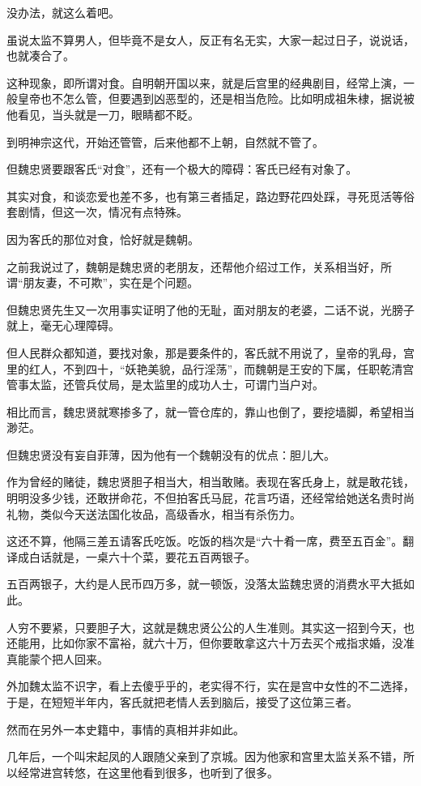\begin{multicols}{\theparacolNo}
		没办法，就这么着吧。

		虽说太监不算男人，但毕竟不是女人，反正有名无实，大家一起过日子，说说话，也就凑合了。

		这种现象，即所谓对食。自明朝开国以来，就是后宫里的经典剧目，经常上演，一般皇帝也不怎么管，但要遇到凶恶型的，还是相当危险。比如明成祖朱棣，据说被他看见，当头就是一刀，眼睛都不眨。

		到明神宗这代，开始还管管，后来他都不上朝，自然就不管了。

		但魏忠贤要跟客氏“对食”，还有一个极大的障碍：客氏已经有对象了。

		其实对食，和谈恋爱也差不多，也有第三者插足，路边野花四处踩，寻死觅活等俗套剧情，但这一次，情况有点特殊。

		因为客氏的那位对食，恰好就是魏朝。

		之前我说过了，魏朝是魏忠贤的老朋友，还帮他介绍过工作，关系相当好，所谓“朋友妻，不可欺”，实在是个问题。

		但魏忠贤先生又一次用事实证明了他的无耻，面对朋友的老婆，二话不说，光膀子就上，毫无心理障碍。

		但人民群众都知道，要找对象，那是要条件的，客氏就不用说了，皇帝的乳母，宫里的红人，不到四十，“妖艳美貌，品行淫荡”，而魏朝是王安的下属，任职乾清宫管事太监，还管兵仗局，是太监里的成功人士，可谓门当户对。

		相比而言，魏忠贤就寒掺多了，就一管仓库的，靠山也倒了，要挖墙脚，希望相当渺茫。

		但魏忠贤没有妄自菲薄，因为他有一个魏朝没有的优点：胆儿大。

		作为曾经的赌徒，魏忠贤胆子相当大，相当敢赌。表现在客氏身上，就是敢花钱，明明没多少钱，还敢拼命花，不但拍客氏马屁，花言巧语，还经常给她送名贵时尚礼物，类似今天送法国化妆品，高级香水，相当有杀伤力。

		这还不算，他隔三差五请客氏吃饭。吃饭的档次是“六十肴一席，费至五百金”。翻译成白话就是，一桌六十个菜，要花五百两银子。

		五百两银子，大约是人民币四万多，就一顿饭，没落太监魏忠贤的消费水平大抵如此。

		人穷不要紧，只要胆子大，这就是魏忠贤公公的人生准则。其实这一招到今天，也还能用，比如你家不富裕，就六十万，但你要敢拿这六十万去买个戒指求婚，没准真能蒙个把人回来。

		外加魏太监不识字，看上去傻乎乎的，老实得不行，实在是宫中女性的不二选择，于是，在短短半年内，客氏就把老情人丢到脑后，接受了这位第三者。

		然而在另外一本史籍中，事情的真相并非如此。

		几年后，一个叫宋起凤的人跟随父亲到了京城。因为他家和宫里太监关系不错，所以经常进宫转悠，在这里他看到很多，也听到了很多。


\end{multicols}
